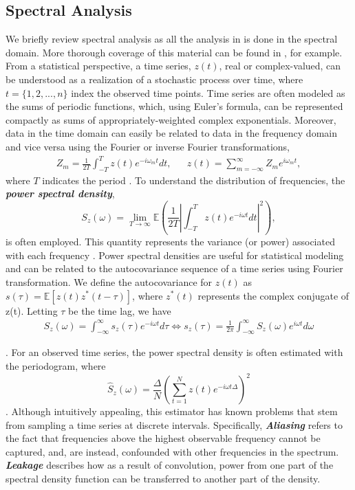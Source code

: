 \documentclass{stat572Style}
\begin{document}
	\subsection{Spectral Analysis}
	\label{sec: specAnalysis}
	\indent We briefly review spectral analysis as all the analysis in \citet{Sykulski2016} is done in the spectral domain.   
	More thorough coverage of this material can be found in  \citep{Percival1993}, for example. 
	From a statistical perspective, a time series, $z(t)$, real or complex-valued,  can be understood as a realization of a stochastic process over time, where  $t = \{1,2,...,n\}$ index the observed time points.  
	Time series are often modeled as the sums of periodic functions, which, using Euler's formula, can be represented compactly as sums of appropriately-weighted complex exponentials. 
	Moreover, data in the time domain can easily be related to data in the frequency domain and vice versa using the Fourier or inverse Fourier transformations,
	\begin{align}
Z_{m} = \frac{1}{2T} \int_{-T}^{T}z(t)e^{-i\omega_{m}t} dt,  && z(t) = \sum_{m=-\infty}^{\infty}Z_{m}e^{i \omega_{m} t},
\end{align}
where $T$ indicates the period \citep{Percival1993}. 
To understand the distribution of frequencies, the \textbf{\it{power spectral density}},
\begin{equation}
S_{z}(\omega) = \underset{T \rightarrow \infty}{\lim} \mathbb{E} \left(\frac{1}{2T} \left| \int_{-T}^{T} z(t) e^{-i \omega t}dt \right|^{2} \right),
\end{equation}
is often employed. 
This quantity represents the variance (or power) associated with each frequency \citep{Percival1993}. 
Power spectral densities are useful for statistical modeling and can be related to the autocovariance sequence of a time series using  Fourier transformation.  
We define the autocovariance  for $z(t)$ as $s(\tau) = \mathbb{E}[z(t) z^{*}(t - \tau)] $, where $z^{*}(t)$ represents the complex conjugate of z(t). Letting $\tau$ be the time lag, we have
\begin{align}
\label{eq: fourierPair}
S_{z}(\omega) = \int_{-\infty}^{\infty}s_{z}(\tau) e^{-i\omega t}d \tau \Longleftrightarrow s_{z}(\tau) = \frac{1}{2\pi} \int_{-\infty}^{\infty}S_{z}(\omega) e^{i \omega t} d\omega 
\end{align}

\noindent \citep{Percival1993}. For an observed time series, the power spectral density is often estimated with the periodogram, where 
\begin{equation}
\label{eq: perio}
\hat{S}_{z}(\omega) = \frac{\Delta}{N} \left( \sum_{t=1}^{N} z(t) e^{-i \omega t \Delta} \right)^{2}
\end{equation}
\citep{Sykulski2013}. 
Although intuitively appealing, this estimator has known problems that stem from  sampling a time series at discrete intervals. 
Specifically, \textbf{\it{Aliasing}} refers to the fact that frequencies above the highest observable frequency cannot be captured, and, are instead, confounded with other frequencies in the spectrum.  
\textbf{\it{Leakage}} describes how as a result of convolution, power from one part of the spectral density function can be transferred to another part of the density. 
\end{document}
